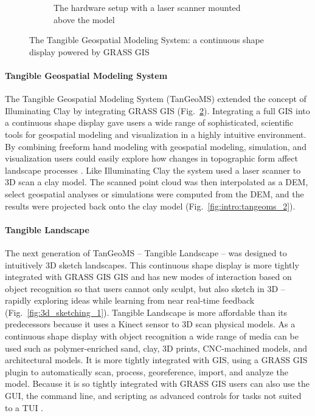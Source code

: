 \documentclass{article}
\begin{document}
\begin{figure}
\begin{subfigure}[b]{0.8\textwidth}
                \caption{The hardware setup with a laser scanner mounted above the model}
                \label{fig:intro:tangeoms_3}
        \end{subfigure}
	\caption{The Tangible Geospatial Modeling System: a continuous shape display powered by GRASS GIS}
	\label{fig:intro:tangeoms}
\end{figure}

\paragraph{Tangible Geospatial Modeling System}
The Tangible Geospatial Modeling System (TanGeoMS) extended the concept of Illuminating Clay
by integrating GRASS GIS (Fig.~\ref{fig:intro:tangeoms}).
Integrating a full GIS into a continuous shape display gave users a wide range of sophisticated, scientific tools for geospatial modeling and visualization in a highly intuitive environment. By combining freeform hand modeling with geospatial modeling, simulation, and visualization users could easily explore how changes in topographic form affect landscape processes \citep{Mitasova2006}. Like Illuminating Clay the system used a laser scanner to 3D scan a clay model. The scanned point cloud was then interpolated as a DEM, select geospatial analyses or simulations were computed from the DEM, and the results were projected back onto the clay model \citep{Tateosian2010} (Fig.~\ref{fig:intro:tangeoms_2}).  

\paragraph{Tangible Landscape}
The next generation of TanGeoMS 
-- Tangible Landscape -- was designed to intuitively 3D sketch landscapes.
This continuous shape display is more tightly integrated with
GRASS GIS GIS and has new modes of interaction based on
object recognition so that users cannot only sculpt,
but also sketch in 3D -- rapidly exploring ideas while learning from near real-time feedback
(Fig.~\ref{fig:3d_sketching_1}).
Tangible Landscape is more affordable than its predecessors because it uses
a Kinect sensor to 3D scan physical models.
As a continuous shape display with object recognition a wide range of media can be used
such as polymer-enriched sand, clay, 3D prints,
CNC-machined models, and architectural models.
It is more tightly integrated with GIS, using a GRASS GIS plugin to automatically scan, process,
georeference, import, and analyze the model.
Because it is so tightly integrated with GRASS GIS users can also use the GUI, the command line,
and scripting as advanced controls for tasks not suited to
a TUI \citep{Petrasova2014}.
\end{document}
